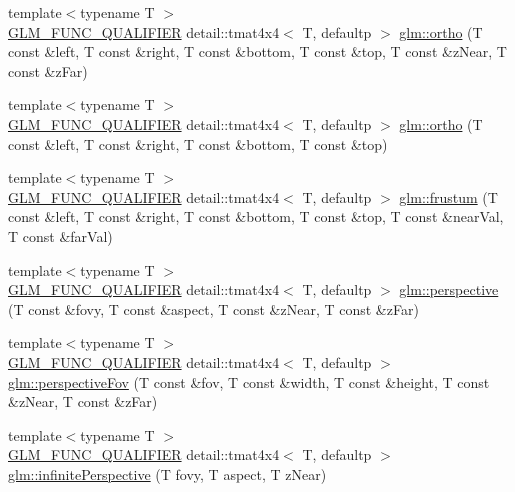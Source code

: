 \begin{DoxyCompactItemize}
{\footnotesize template$<$typename T $>$ }\\\hyperlink{setup_8hpp_a33fdea6f91c5f834105f7415e2a64407}{G\+L\+M\+\_\+\+F\+U\+N\+C\+\_\+\+Q\+U\+A\+L\+I\+F\+I\+ER} detail\+::tmat4x4$<$ T, defaultp $>$ \hyperlink{group__gtc__matrix__transform_gac393e9262776e4980731c386123e4377}{glm\+::ortho} (T const \&left, T const \&right, T const \&bottom, T const \&top, T const \&z\+Near, T const \&z\+Far)
\item 
{\footnotesize template$<$typename T $>$ }\\\hyperlink{setup_8hpp_a33fdea6f91c5f834105f7415e2a64407}{G\+L\+M\+\_\+\+F\+U\+N\+C\+\_\+\+Q\+U\+A\+L\+I\+F\+I\+ER} detail\+::tmat4x4$<$ T, defaultp $>$ \hyperlink{group__gtc__matrix__transform_gab03587bce3510aa5d2f4e5f1be6c2370}{glm\+::ortho} (T const \&left, T const \&right, T const \&bottom, T const \&top)
\item 
{\footnotesize template$<$typename T $>$ }\\\hyperlink{setup_8hpp_a33fdea6f91c5f834105f7415e2a64407}{G\+L\+M\+\_\+\+F\+U\+N\+C\+\_\+\+Q\+U\+A\+L\+I\+F\+I\+ER} detail\+::tmat4x4$<$ T, defaultp $>$ \hyperlink{group__gtc__matrix__transform_ga486d3d6819c04880559f3dccd38f9f58}{glm\+::frustum} (T const \&left, T const \&right, T const \&bottom, T const \&top, T const \&near\+Val, T const \&far\+Val)
\item 
{\footnotesize template$<$typename T $>$ }\\\hyperlink{setup_8hpp_a33fdea6f91c5f834105f7415e2a64407}{G\+L\+M\+\_\+\+F\+U\+N\+C\+\_\+\+Q\+U\+A\+L\+I\+F\+I\+ER} detail\+::tmat4x4$<$ T, defaultp $>$ \hyperlink{group__gtc__matrix__transform_ga6c82aa0ea748cfbb16887d81cf6c5a10}{glm\+::perspective} (T const \&fovy, T const \&aspect, T const \&z\+Near, T const \&z\+Far)
\item 
{\footnotesize template$<$typename T $>$ }\\\hyperlink{setup_8hpp_a33fdea6f91c5f834105f7415e2a64407}{G\+L\+M\+\_\+\+F\+U\+N\+C\+\_\+\+Q\+U\+A\+L\+I\+F\+I\+ER} detail\+::tmat4x4$<$ T, defaultp $>$ \hyperlink{group__gtc__matrix__transform_gac00bf68d4f7ec62380b84c5354567f71}{glm\+::perspective\+Fov} (T const \&fov, T const \&width, T const \&height, T const \&z\+Near, T const \&z\+Far)
\item 
{\footnotesize template$<$typename T $>$ }\\\hyperlink{setup_8hpp_a33fdea6f91c5f834105f7415e2a64407}{G\+L\+M\+\_\+\+F\+U\+N\+C\+\_\+\+Q\+U\+A\+L\+I\+F\+I\+ER} detail\+::tmat4x4$<$ T, defaultp $>$ \hyperlink{group__gtc__matrix__transform_ga63ba1ddb9c4a08d4e58becd0dc5b725a}{glm\+::infinite\+Perspective} (T fovy, T aspect, T z\+Near)

\end{DoxyCompactItemize}
